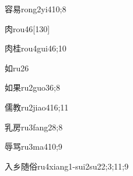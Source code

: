 \begin{verbete}{容易}{rong2yi4}{10;8}
\end{verbete}

\begin{verbete}{肉}{rou4}{6}[130]
\end{verbete}

\begin{verbete}{肉桂}{rou4gui4}{6;10}
\end{verbete}

\begin{verbete}{如}{ru2}{6}
\end{verbete}

\begin{verbete}{如果}{ru2guo3}{6;8}
\end{verbete}

\begin{verbete}{儒教}{ru2jiao4}{16;11}
\end{verbete}

\begin{verbete}{乳房}{ru3fang2}{8;8}
\end{verbete}

\begin{verbete}{辱骂}{ru3ma4}{10;9}
\end{verbete}

\begin{verbete}{入乡随俗}{ru4xiang1-sui2su2}{2;3;11;9}
\end{verbete}

